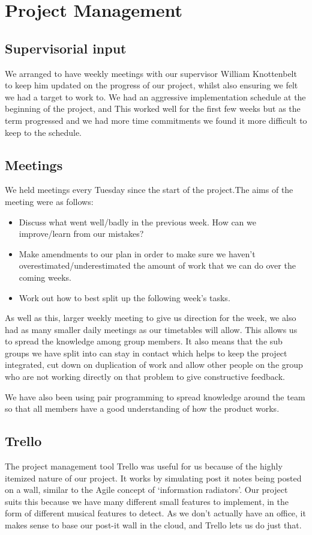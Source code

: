 \section{Project Management}
\subsection{Supervisorial input}
We arranged to have weekly meetings with our supervisor William Knottenbelt to keep him updated on the progress of our project, whilst also ensuring we felt we had a target to work to. We had an aggressive implementation schedule at the beginning of the project, and  This worked well for the first few weeks but as the term progressed and we had more time commitments we found it more difficult to keep to the schedule.
\subsection{Meetings}
We held meetings every Tuesday since the start of the project.The aims of the meeting were as follows:
\begin{itemize}
	\item Discuss what went well/badly in the previous week. How can we improve/learn from our mistakes?
	\item Make amendments to our plan in order to make sure we haven't overestimated/underestimated the amount of work that we can do over the coming weeks.
	\item Work out how to best split up the following week's tasks.
\end{itemize}
As well as this, larger weekly meeting to give us direction for the week, we also had as many smaller daily meetings as our timetables will allow. This allows us to spread the knowledge among group members. It also means that the sub groups we have split into can stay in contact which helps to keep the project integrated, cut down on duplication of work and allow other people on the group who are not working directly on that problem to give constructive feedback.

We have also been using pair programming to spread knowledge around the team so that all members have a good understanding of how the product works. 

\subsection{Trello}
The project management tool Trello was useful for us because of the highly itemized nature of our project. It works by simulating post it notes being posted on a wall, similar to the Agile concept of \lq information radiators\rq . Our project suits this because we have many different small features to implement, in the form of different musical features to detect.  As we don't actually have an office, it makes sense to base our post-it wall in the cloud, and Trello lets us do just that.


